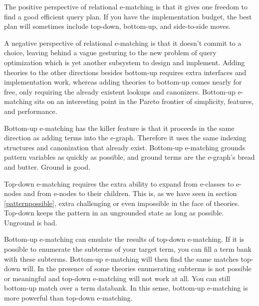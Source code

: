 \documentclass[sigconf]{acmart}
\begin{document}
The positive perspective of relational e-matching \cite{zhang2022relationalematching} is that it gives one freedom to find a good efficient query plan. If you have the implementation budget, the best plan will sometimes include top-down, bottom-up, and side-to-side moves. 

A negative perspective of relational e-matching is that it doesn't commit to a choice, leaving behind a vague gesturing to the new problem of query optimization which is yet another subsystem to design and implement. Adding theories to the other directions besides bottom-up requires extra interfaces and implementation work, whereas adding theories to bottom-up comes nearly for free, only requiring the already existent lookups and canonizers. Bottom-up e-matching sits on an interesting point in the Pareto frontier of simplicity, features, and performance.




Bottom-up e-matching has the killer feature is that it proceeds in the same direction as adding terms into the e-graph. Therefore it uses the same indexing structures and canonization that already exist. Bottom-up e-matching grounds pattern variables as quickly as possible, and ground terms are the e-graph's bread and butter. Ground is good.

Top-down e-matching requires the extra ability to expand from e-classes to e-nodes and from e-nodes to their children. This is, as we have seen in section \ref{patternpossible}, extra challenging or even impossible in the face of theories. Top-down keeps the pattern in an ungrounded state as long as possible. Unground is bad.

Bottom-up e-matching can emulate the results of top-down e-matching. If it is possible to enumerate the subterms of your target term, you can fill a term bank with these subterms. Bottom-up e-matching will then find the same matches top-down will. In the presence of some theories enumerating subterms is not possible or meaningful and top-down e-matching will not work at all. You can still bottom-up match over a term databank. In this sense, bottom-up e-matching is more powerful than top-down e-matching.





\end{document}
